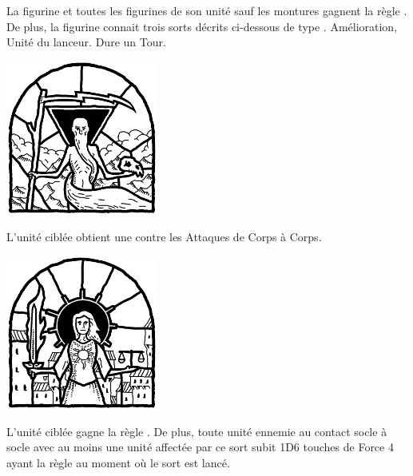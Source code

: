 \armyspecialruleentry{\blessings}

La figurine et toutes les figurines de son unité sauf les montures gagnent la règle \hatred{}. De plus, la figurine connait trois sorts décrits ci-dessous de type . Amélioration, Unité du lanceur. Dure un Tour.
\begin{multicols}{3}
\raggedcolumns
\begin{center}
	\includegraphics[width=5cm]{pics/ullorsblessing.png}
	
	\vspace*{5pt}{\Largerfontsize\antiquefont\ullorsblessing{}}
	
	\vspace*{5pt}L'unité ciblée obtient une  contre les Attaques de Corps à Corps.
\end{center}

\vspace*{\fill}
\columnbreak

\begin{center}
	\includegraphics[width=5cm]{pics/sunnasblessing.png}
	
	\vspace*{5pt}{\Largerfontsize\antiquefont\sunnasblessing{}}
	
	\vspace*{5pt}L'unité ciblée gagne la règle \flamingattacks{}. De plus, toute unité ennemie au contact socle à socle avec au moins une unité affectée par ce sort subit 1D6 touches de Force 4 ayant la règle \flamingattacks{} au moment où le sort est lancé.
\end{center}


\end{multicols}
